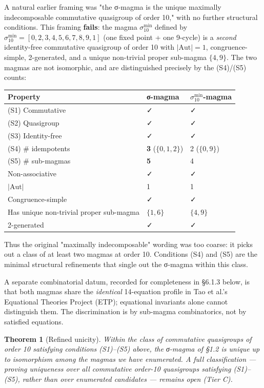 \documentclass[11pt,reqno]{amsart}
\theoremstyle{plain}
\newtheorem{theorem}{Theorem}[section]
\theoremstyle{definition}
\begin{document}
A natural earlier framing was "the σ-magma is the unique maximally indecomposable commutative quasigroup of order 10," with no further structural conditions. This framing \textbf{fails}: the magma $\sigma_{10}^{\min}$ defined by $\sigma_{10}^{\min} = [0, 2, 3, 4, 5, 6, 7, 8, 9, 1]$ (one fixed point + one 9-cycle) is a \textit{second} identity-free commutative quasigroup of order 10 with $|\mathrm{Aut}| = 1$, congruence-simple, 2-generated, and a unique non-trivial proper sub-magma $\{4, 9\}$. The two magmas are not isomorphic, and are distinguished precisely by the (S4)/(S5) counts:

\begin{center}
\begin{tabular}{lll}
\toprule
Property & σ-magma & $\sigma_{10}^{\min}$-magma \\
\midrule
(S1) Commutative & ✓ & ✓ \\
(S2) Quasigroup & ✓ & ✓ \\
(S3) Identity-free & ✓ & ✓ \\
(S4) \# idempotents & \textbf{3} ($\{0, 1, 2\}$) & 2 ($\{0, 9\}$) \\
(S5) \# sub-magmas & \textbf{5} & 4 \\
Non-associative & ✓ & ✓ \\
$|\mathrm{Aut}|$ & 1 & 1 \\
Congruence-simple & ✓ & ✓ \\
Has unique non-trivial proper sub-magma & $\{1, 6\}$ & $\{4, 9\}$ \\
2-generated & ✓ & ✓ \\
\bottomrule
\end{tabular}
\end{center}

Thus the original "maximally indecomposable" wording was too coarse: it picks out a class of at least two magmas at order 10. Conditions (S4) and (S5) are the minimal structural refinements that single out the σ-magma within this class.

A separate combinatorial datum, recorded for completeness in §6.1.3 below, is that both magmas share the \textit{identical} 14-equation profile in Tao et al.'s Equational Theories Project (ETP); equational invariants alone cannot distinguish them. The discrimination is by sub-magma combinatorics, not by satisfied equations.

\begin{theorem}[Refined unicity]
Within the class of commutative quasigroups of order 10 satisfying conditions (S1)--(S5) above, the σ-magma of §1.2 is unique up to isomorphism among the magmas we have enumerated. A full classification --- proving uniqueness over all commutative order-10 quasigroups satisfying (S1)--(S5), rather than over enumerated candidates --- remains open (Tier C).
\end{theorem}
\end{document}
